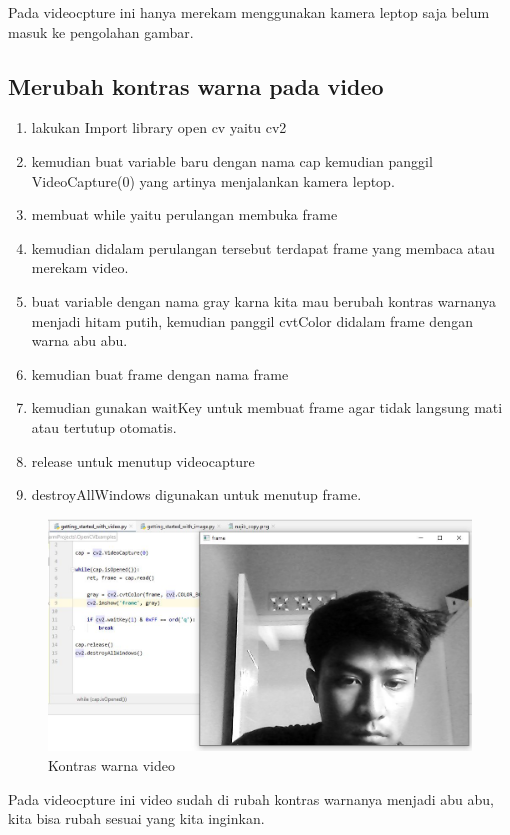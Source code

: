 Pada videocpture ini hanya merekam menggunakan kamera leptop saja belum masuk ke pengolahan gambar.

\newpage
\subsection{Merubah kontras warna pada video}

\begin{enumerate}
	\item lakukan Import library open cv yaitu cv2
	\item kemudian buat variable baru dengan nama cap kemudian panggil VideoCapture(0) yang artinya menjalankan kamera leptop.
	\item membuat while yaitu perulangan membuka frame
	\item kemudian didalam perulangan tersebut terdapat frame yang membaca atau merekam video.
	\item buat variable dengan nama gray karna kita mau berubah kontras warnanya menjadi hitam putih, kemudian panggil cvtColor didalam frame dengan warna abu abu.
	\item kemudian buat frame dengan nama frame
	\item kemudian gunakan waitKey untuk membuat frame agar tidak langsung mati atau tertutup otomatis.
	\item release untuk menutup videocapture
	\item destroyAllWindows digunakan untuk menutup frame.
\end{enumerate}

\begin{figure}[ht]
\centering
\includegraphics[scale=0.5]{figures/2,5.jpg}
\caption{Kontras warna video}
\label{contoh}
\end{figure}

Pada videocpture ini video sudah di rubah kontras warnanya menjadi abu abu, kita bisa rubah sesuai yang kita inginkan.

